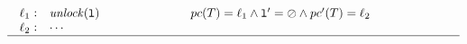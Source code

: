 \begin{description}
\[\begin{array}[t]{p{8em}@{\hspace{6em}}p{\longtablesize}}
				$\begin{array}[t]{l@{\hspace{0.3em}}c@{\hspace{1em}}l}
					\ell_1 & : & \mathtt{\fUnlock(l)} \\
					\ell_2 & : & \mathtt{\cdots}
				\end{array}$
				&
				$\begin{array}[t]{ll}
					\pc(T) = \ell_1 \andcond
						\mathtt{l}' = \oslash \andcond \pc'(T) = \ell_2
				 \end{array}$ \\ \hline
			 \end{array}
		\]
%
\end{description}
